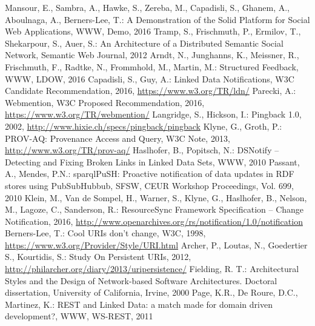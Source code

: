 \documentclass[a4paper]{llncs}
\begin{document}
\begin{thebibliography}{99}
   Mansour, E., Sambra, A., Hawke, S., Zereba, M., Capadisli, S., Ghanem, A., Aboulnaga, A., Berners-Lee, T.: A Demonstration of the Solid Platform for Social Web Applications, WWW, Demo, 2016%
   Tramp, S., Frischmuth, P., Ermilov, T., Shekarpour, S., Auer, S.: An Architecture of a Distributed Semantic Social Network, Semantic Web Journal, 2012
   Arndt, N., Junghanns, K., Meissner, R., Frischmuth, F., Radtke, N., Frommhold, M., Martin, M.: Structured Feedback, WWW, LDOW, 2016%
   Capadisli, S., Guy, A.: Linked Data Notifications, W3C Candidate Recommendation, 2016, \url{https://www.w3.org/TR/ldn/}
   Parecki, A.: Webmention, W3C Proposed Recommendation, 2016,  \url{https://www.w3.org/TR/webmention/}
   Langridge, S., Hickson, I.: Pingback 1.0, 2002,  \url{http://www.hixie.ch/specs/pingback/pingback}
   Klyne, G., Groth, P.: PROV-AQ: Provenance Access and Query,  W3C Note, 2013, \url{http://www.w3.org/TR/prov-aq/}
   Haslhofer, B., Popitsch, N.: DSNotify – Detecting and Fixing Broken Links in Linked Data Sets, WWW, 2010%
   Passant, A., Mendes, P.N.: sparqlPuSH: Proactive notification of data updates in RDF stores using PubSubHubbub, SFSW, CEUR Workshop Proceedings, Vol. 699, 2010%
   Klein, M., Van de Sompel, H., Warner, S., Klyne, G., Haslhofer, B., Nelson, M., Lagoze, C., Sanderson, R.: ResourceSync Framework Specification – Change Notification, 2016,  \url{http://www.openarchives.org/rs/notification/1.0/notification}
   Berners-Lee, T.: Cool URIs don't change, W3C, 1998,  \url{https://www.w3.org/Provider/Style/URI.html}
   Archer, P., Loutas, N., Goedertier S., Kourtidis, S.: Study On Persistent URIs, 2012, \url{http://philarcher.org/diary/2013/uripersistence/}
   Fielding, R. T.: Architectural Styles and the Design of Network-based Software Architectures. Doctoral dissertation, University of California, Irvine, 2000%
   Page, K.R., De Roure, D.C., Martinez, K.: REST and Linked Data: a match made for domain driven development?, WWW, WS-REST, 2011%

\end{thebibliography}
\end{document}
